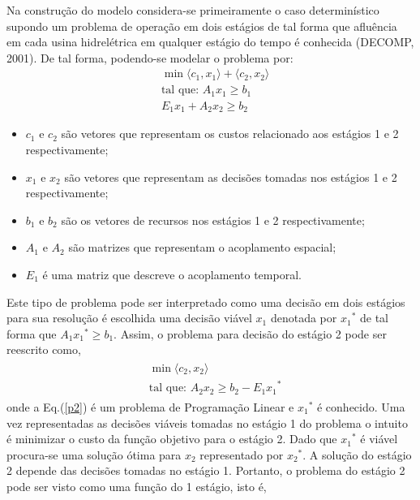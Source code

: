 \documentclass[12pt,fleqn]{article}
\begin{document}
Na constru\c c\~ao do modelo considera-se primeiramente o caso determin\'istico supondo um problema de opera\c
c\~ao em dois est\'agios de tal forma que 
aflu\^encia em cada usina hidrel\'etrica em qualquer est\'agio do tempo \'e conhecida (DECOMP, 2001). De tal forma,
podendo-se modelar o problema por:
\begin{align}
\label{t1}
&\min \langle c_1,x_1\rangle + \langle c_2,x_2\rangle \nonumber \\
&\mbox{tal que: }	A_1 x_1 \geq b_1 \\
&E_1 x_1 + A_2 x_2 \geq b_2 \nonumber
\end{align}
\begin{itemize}[itemsep=-2pt]
  \item $c_1$ e $c_2$ s\~ao vetores que representam os custos relacionado aos est\'agios 1 e 2 respectivamente;
  \item $x_1$ e $x_2$ s\~ao vetores que representam as decis\~oes tomadas nos est\'agios 1 e 2 respectivamente;
  \item $b_1$ e $b_2$  s\~ao os vetores de recursos nos est\'agios 1 e 2 respectivamente;   \item $A_1$ e $A_2$ s\~ao matrizes que representam o acoplamento espacial;
  \item $E_1$ \'e uma matriz que descreve o acoplamento temporal.
\end{itemize}
Este tipo de problema pode ser interpretado como uma decis\~ao em dois est\'agios para sua resolu\c c\~ao \'e
escolhida uma decis\~ao vi\'avel $x_1$ denotada por ${x_1}^{*}$ de tal forma que $A_1{x_1}^{*} \geq b_1$. 
Assim, o problema para decis\~ao do est\'agio 2 pode ser reescrito como, 
\begin{align}
  \begin{split}	
 & 	\min \langle c_2,x_2\rangle  \\
&\mbox{tal que: }A_2 x_2 \geq b_2 -{E_1 x_1}^{*}  
  \end{split}
    \label{p2}
\end{align}
onde a Eq.(\ref {p2}) \'e um problema de Programa\c c\~ao Linear e ${x_1}^{*}$ \'e conhecido. Uma vez representadas as decis\~oes vi\'aveis tomadas no est\'agio 1 do
problema o intuito \'e minimizar o custo da fun\c c\~ao objetivo para o est\'agio 2. Dado que ${x_1}^{*}$ \'e vi\'avel procura-se uma solu\c c\~ao \'otima para $x_2$ representado por
${x_2}^{*}$. A solu\c c\~ao do est\'agio 2 depende das decis\~oes tomadas no est\'agio 1. Portanto, o
problema do est\'agio 2 pode ser visto como uma fun\c c\~ao do 1 est\'agio, isto \'e,
\end{document}

